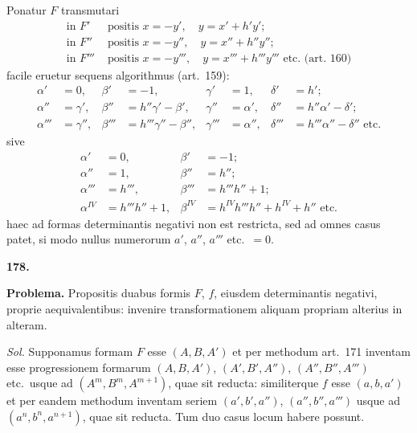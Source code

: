 \documentclass[12pt,a4paper]{article}
\theoremstyle{plain}
\begin{document}
Ponatur $F$ transmutari
\begin{align*}
\text{in } F' &\text{ positis } x = -y', \quad y = x' + h'y';\\
\text{in } F'' &\text{ positis } x = -y'', \quad y = x'' + h''y'';\\
\text{in } F''' &\text{ positis } x = -y''', \quad y = x''' + h'''y''' \text{ etc. (art. 160)}
\end{align*}
facile eruetur sequens algorithmus (art.~159):
\[
\begin{aligned}
\alpha' &= 0, & \beta' &= -1, & \gamma' &= 1, & \delta' &= h';\\
\alpha'' &= \gamma', & \beta'' &= h''\gamma' - \beta', & \gamma'' &= \alpha', & \delta'' &= h''\alpha' - \delta';\\
\alpha''' &= \gamma'', & \beta''' &= h'''\gamma'' - \beta'', & \gamma''' &= \alpha'', & \delta''' &= h'''\alpha'' - \delta'' \text{ etc.}
\end{aligned}
\]
sive
\[
\begin{aligned}
\alpha' &= 0, & \beta' &= -1;\\
\alpha'' &= 1, & \beta'' &= h'';\\
\alpha''' &= h''', & \beta''' &= h'''h'' + 1;\\
\alpha^{IV} &= h'''h'' + 1, & \beta^{IV} &= h^{IV}h'''h'' + h^{IV} + h'' \text{ etc.}
\end{aligned}
\]
haec ad formas determinantis negativi non est restricta, sed ad omnes casus patet, si modo nullus numerorum $a'$, $a''$, $a'''$ etc.~$= 0$.

\bigskip

\textbf{178.}

\textbf{Problema.} Propositis duabus formis $F$, $f$, eiusdem determinantis negativi, proprie aequivalentibus: invenire transformationem aliquam propriam alterius in alteram.

\textit{Sol.} Supponamus formam $F$ esse $(A, B, A')$ et per methodum art.~171 inventam esse progressionem formarum $(A, B, A')$, $(A', B', A'')$, $(A'', B'', A''')$ etc.~usque ad $(A^m, B^m, A^{m+1})$, quae sit reducta: similiterque $f$ esse $(a,b,a')$ et per eandem methodum inventam seriem $(a',b',a'')$, $(a'',b'',a''')$ usque ad $(a^n, b^n, a^{n+1})$, quae sit reducta. Tum duo casus locum habere possunt.
\end{document}
